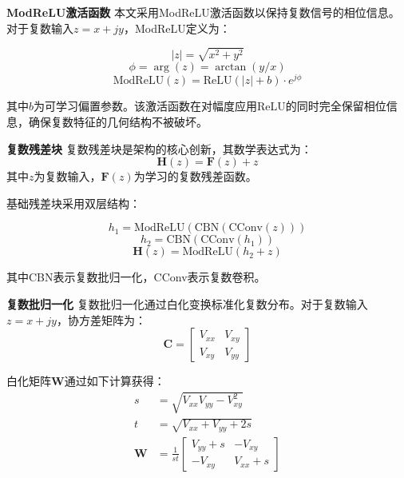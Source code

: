\documentclass[conference]{IEEEtran}
\begin{document}
\textbf{ModReLU激活函数} 本文采用ModReLU激活函数以保持复数信号的相位信息。对于复数输入$z = x + jy$，ModReLU定义为：

\begin{equation}
|z| = \sqrt{x^2 + y^2}
\end{equation}
\begin{equation}
\phi = \arg(z) = \arctan(y/x)
\end{equation}
\begin{equation}
\text{ModReLU}(z) = \text{ReLU}(|z| + b) \cdot e^{j\phi}
\end{equation}


其中$b$为可学习偏置参数。该激活函数在对幅度应用ReLU的同时完全保留相位信息，确保复数特征的几何结构不被破坏。

\textbf{复数残差块} 复数残差块是架构的核心创新，其数学表达式为：
\begin{equation}
\mathbf{H}(z) = \mathbf{F}(z) + z
\end{equation}
其中$z$为复数输入，$\mathbf{F}(z)$为学习的复数残差函数。

基础残差块采用双层结构：

\begin{equation}
h_1 = \text{ModReLU}(\text{CBN}(\text{CConv}(z)))
\end{equation}
\begin{equation}
h_2 = \text{CBN}(\text{CConv}(h_1))
\end{equation}
\begin{equation}
\mathbf{H}(z) = \text{ModReLU}(h_2 + z)
\end{equation}


其中CBN表示复数批归一化，CConv表示复数卷积。

\textbf{复数批归一化} 复数批归一化通过白化变换标准化复数分布。对于复数输入$z = x + jy$，协方差矩阵为：
\begin{equation}
\mathbf{C} = \begin{bmatrix} V_{xx} & V_{xy} \\ V_{xy} & V_{yy} \end{bmatrix}
\end{equation}

白化矩阵$\mathbf{W}$通过如下计算获得：
\begin{align}
s &= \sqrt{V_{xx}V_{yy} - V_{xy}^2} \\
t &= \sqrt{V_{xx} + V_{yy} + 2s} \\
\mathbf{W} &= \frac{1}{st}\begin{bmatrix} V_{yy} + s & -V_{xy} \\ -V_{xy} & V_{xx} + s \end{bmatrix}
\end{align}
\end{document}

